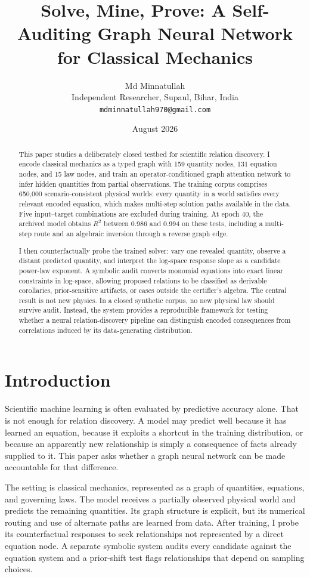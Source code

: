 \documentclass[11pt]{article}
\title{Solve, Mine, Prove: A Self-Auditing Graph Neural Network for Classical Mechanics}
\author{Md Minnatullah\\
\small Independent Researcher, Supaul, Bihar, India\\
\small \texttt{mdminnatullah970@gmail.com}}
\date{August 2026}
\begin{document}
\maketitle

\begin{abstract}
This paper studies a deliberately closed testbed for scientific relation discovery. I encode classical mechanics as a typed graph with 159 quantity nodes, 131 equation nodes, and 15 law nodes, and train an operator-conditioned graph attention network to infer hidden quantities from partial observations. The training corpus comprises 650,000 scenario-consistent physical worlds: every quantity in a world satisfies every relevant encoded equation, which makes multi-step solution paths available in the data. Five input--target combinations are excluded during training. At epoch 40, the archived model obtains $R^2$ between 0.986 and 0.994 on these tests, including a multi-step route and an algebraic inversion through a reverse graph edge.

I then counterfactually probe the trained solver: vary one revealed quantity, observe a distant predicted quantity, and interpret the log-space response slope as a candidate power-law exponent. A symbolic audit converts monomial equations into exact linear constraints in log-space, allowing proposed relations to be classified as derivable corollaries, prior-sensitive artifacts, or cases outside the certifier's algebra. The central result is not new physics. In a closed synthetic corpus, no new physical law should survive audit. Instead, the system provides a reproducible framework for testing whether a neural relation-discovery pipeline can distinguish encoded consequences from correlations induced by its data-generating distribution.
\end{abstract}

\section{Introduction}

Scientific machine learning is often evaluated by predictive accuracy alone. That is not enough for relation discovery. A model may predict well because it has learned an equation, because it exploits a shortcut in the training distribution, or because an apparently new relationship is simply a consequence of facts already supplied to it. This paper asks whether a graph neural network can be made accountable for that difference.

The setting is classical mechanics, represented as a graph of quantities, equations, and governing laws. The model receives a partially observed physical world and predicts the remaining quantities. Its graph structure is explicit, but its numerical routing and use of alternate paths are learned from data. After training, I probe its counterfactual responses to seek relationships not represented by a direct equation node. A separate symbolic system audits every candidate against the equation system and a prior-shift test flags relationships that depend on sampling choices.
\end{document}
